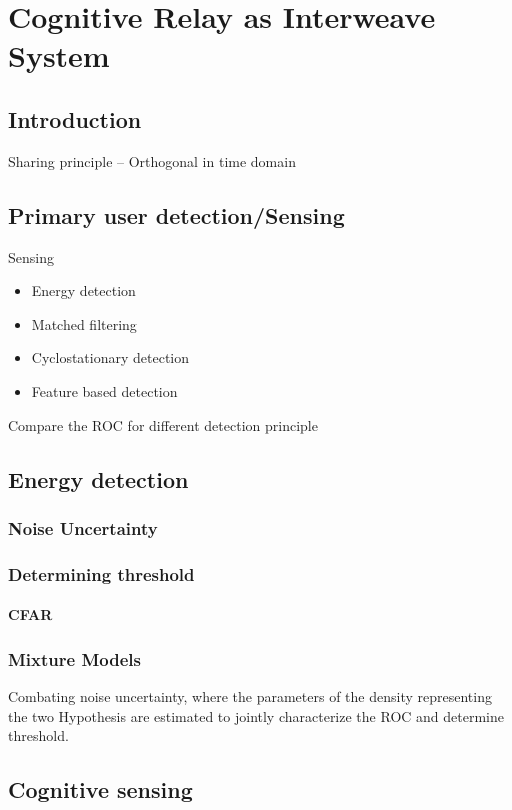 \chapter{Cognitive Relay as Interweave System}
\label{chap:IS}

\section{Introduction}
Sharing principle -- Orthogonal in time domain 

\section{Primary user detection/Sensing}
Sensing \\ 
\begin{itemize}
\item Energy detection
\item Matched filtering
\item Cyclostationary detection
\item Feature based detection
\end{itemize}
Compare the \ac{ROC} for different detection principle 

\section{Energy detection}
\subsection{Noise Uncertainty}
\subsection{Determining threshold} 
\subsubsection{\ac{CFAR}}

\subsection{Mixture Models}
Combating noise uncertainty, where the parameters of the density representing the two Hypothesis are estimated to jointly characterize the \ac{ROC} and determine threshold. 

\section{Cognitive sensing}
